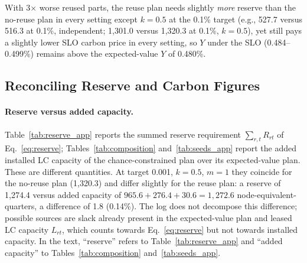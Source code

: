 \documentclass{article} %
\begin{document}
With 3$\times$ worse reused parts, the reuse plan needs slightly \emph{more} reserve than the no-reuse plan in every setting except $k=0.5$ at the 0.1\% target (e.g., 527.7 versus 516.3 at 0.1\%, independent; 1,301.0 versus 1,320.3 at 0.1\%, $k=0.5$), yet still pays a slightly lower SLO carbon price in every setting, so $Y$ under the SLO (0.484--0.499\%) remains above the expected-value $Y$ of 0.480\%.

\begin{table}[h]
\caption{SLO reserve decomposition across Monte Carlo seeds (target 0.001, $k=0.5$, $m=1$). Carbon in tCO$_2$e; capacity (added installed LC capacity, chance-constrained minus expected-value plan) in node-equivalent-quarters. Gap = embodied gap + operational gap + spares-and-logistics gap (not logged per seed; $-8$~tCO$_2$e for seed 0 from Table~\ref{tab:composition}), up to rounding; see Appendix~\ref{app:reconcile}.}
\label{tab:seeds_app}
\begin{center}
\small
{}
\end{center}
\end{table}

\subsection{Reconciling Reserve and Carbon Figures}
\label{app:reconcile}
\paragraph{Reserve versus added capacity.} Table~\ref{tab:reserve_app} reports the summed reserve requirement $\sum_{r,t}R_{rt}$ of Eq.~\ref{eq:reserve}; Tables~\ref{tab:composition} and~\ref{tab:seeds_app} report the added installed LC capacity of the chance-constrained plan over its expected-value plan. These are different quantities. At target 0.001, $k=0.5$, $m=1$ they coincide for the no-reuse plan (1,320.3) and differ slightly for the reuse plan: a reserve of 1,274.4 versus added capacity of $965.6 + 276.4 + 30.6 = 1{,}272.6$ node-equivalent-quarters, a difference of 1.8 (0.14\%). The log does not decompose this difference; possible sources are slack already present in the expected-value plan and leased LC capacity $L_{rt}$, which counts towards Eq.~\ref{eq:reserve} but not towards installed capacity. In the text, ``reserve'' refers to Table~\ref{tab:reserve_app} and ``added capacity'' to Tables~\ref{tab:composition} and~\ref{tab:seeds_app}.
\end{document}
